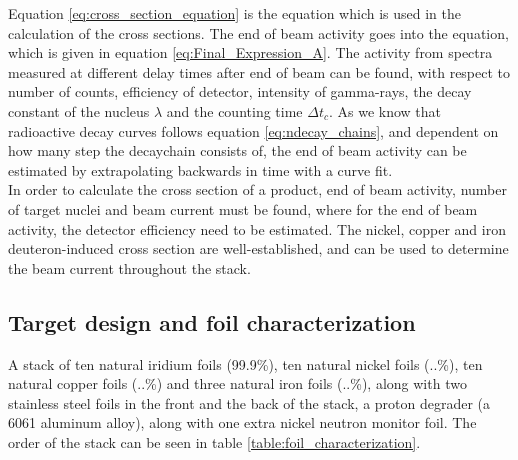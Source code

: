 \documentclass[a4paper,11pt,twoside]{book}
\begin{document}
\noindent 


\noindent 

\noindent 
Equation \ref{eq:cross_section_equation} is the equation which is used in the calculation of the cross sections. The end of beam activity goes into the equation, which is given in equation \ref{eq:Final_Expression_A}. The activity from spectra measured at different delay times after end of beam can be found, with respect to number of counts, efficiency of detector, intensity of gamma-rays, the decay constant of the nucleus $\lambda$ and the counting time $\Delta t_c$. As we know that radioactive decay curves follows equation \ref{eq:ndecay_chains}, and dependent on how many step the decaychain consists of, the end of beam activity can be estimated by extrapolating backwards in time with a curve fit. \\

\noindent 
In order to calculate the cross section of a product, end of beam activity, number of target nuclei and beam current must be found, where for the end of beam activity, the detector efficiency need to be estimated. 
The nickel, copper and iron deuteron-induced cross section are well-established, and can  be used to determine the beam current throughout the stack. 


\subsection{Target design and foil characterization}

A stack of ten natural iridium foils (99.9\%), ten natural nickel foils (..\%), ten natural copper foils (..\%) and three natural iron foils (..\%), along with two stainless steel foils in the front and the back of the stack, a proton degrader (a 6061 aluminum alloy), along with one extra nickel neutron monitor foil. The order of the stack can be seen in table \ref{table:foil_characterization}. \\
\end{document}
